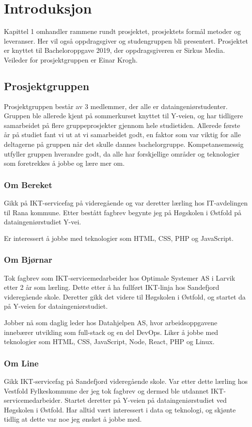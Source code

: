 \cleardoublepage
\chapter{Introduksjon}
\label{chap:intro}
Kapittel 1 omhandler rammene rundt prosjektet, prosjektets formål metoder og leveranser. Her vil også oppdragsgiver og studengruppen bli presentert. Prosjektet er knyttet til Bacheloroppgave 2019, der oppdragsgiveren er Sirkus Media. Veileder for prosjektgruppen er Einar Krogh. 

\section{Prosjektgruppen}

Prosjektgruppen består av 3 medlemmer, der alle er dataingeniørstudenter. Gruppen ble allerede kjent på sommerkurset knyttet til Y-veien, og har tidligere samarbeidet på flere gruppeprosjekter gjennom hele studietiden. Allerede første år på studiet fant vi ut at vi samarbeidet godt, en faktor som var viktig for alle deltagerne på gruppen når det skulle dannes bachelorgruppe. Kompetansemessig utfyller gruppen hverandre godt, da alle har forskjellige områder og teknologier som foretrekkes å jobbe og lære mer om.  

\subsection{Om Bereket}
Gikk på IKT-servicefag på  videregående og var deretter lærling hos IT-avdelingen til Rana kommune. Etter bestått fagbrev begynte jeg på Høgskolen i Østfold på dataingeniørstudiet Y-vei.

Er interessert å jobbe med teknologier som HTML, CSS, PHP og JavaScript.

\subsection{Om Bjørnar}
Tok fagbrev som IKT-servicemedarbeider hos Optimale Systemer AS i Larvik etter 2 år som lærling. Dette etter å ha fullført IKT-linja hos Sandefjord videregående skole. Deretter gikk det videre til Høgskolen i Østfold, og startet da på Y-veien for dataingeniørstudiet.

Jobber nå som daglig leder hos Datahjelpen AS, hvor arbeidsoppgavene innebærer utvikling som full-stack og en del DevOps. Liker å jobbe med teknologier som HTML, CSS, JavaScript, Node, React, PHP og Linux.

\subsection{Om Line}
Gikk IKT-servicefag på Sandefjord videregående skole. Var etter dette lærling hos Vestfold Fylkeskommune der jeg tok fagbrev og dermed ble utdannet IKT-servicemedarbeider. Startet deretter på Y-veien på dataingeniørstudiet ved Høgskolen i Østfold. Har alltid vært interessert i data og teknologi, og skjønte tidlig at dette var noe jeg ønsket å jobbe med.

